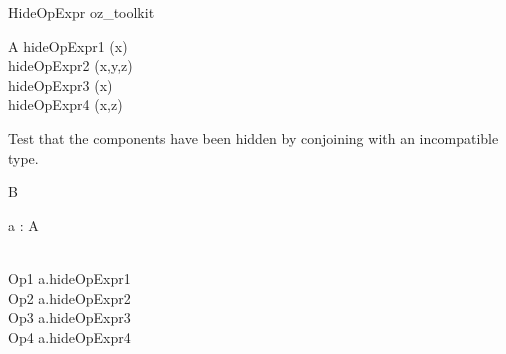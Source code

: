 \begin{zsection}
  \SECTION HideOpExpr \parents oz\_toolkit
\end{zsection}

\begin{class}{A}
  hideOpExpr1 \sdef [x : \nat] \hide (x) \\
  hideOpExpr2 \sdef [x,y,z : \nat] \hide (x,y,z) \\
  hideOpExpr3 \sdef [x,y,z : \nat] \hide (x)\\
  hideOpExpr4 \sdef [x,y,z : \nat] \hide (x,z)\\
\end{class}

Test that the components have been hidden by conjoining with an
incompatible type.
\begin{class}{B}
 \begin{state}
   a : A
 \end{state}\\
 Op1 \sdef a.hideOpExpr1 \\
 Op2 \sdef a.hideOpExpr2 \\
 Op3 \sdef a.hideOpExpr3 \\
 Op4 \sdef a.hideOpExpr4 \\
\end{class}
